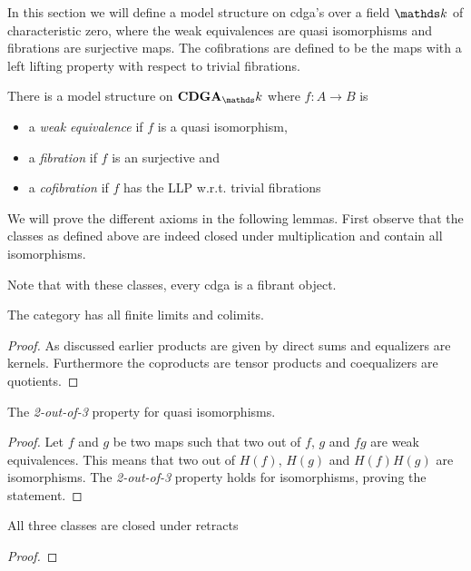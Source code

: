 
In this section we will define a model structure on cdga's over a field $\k$ of characteristic zero, where the weak equivalences are quasi isomorphisms and fibrations are surjective maps. The cofibrations are defined to be the maps with a left lifting property with respect to trivial fibrations.

\begin{proposition}
	There is a model structure on $\CDGA_\k$ where $f: A \to B$ is
	\begin{itemize}
		\item a \emph{weak equivalence} if $f$ is a quasi isomorphism,
		\item a \emph{fibration} if $f$ is an surjective and
		\item a \emph{cofibration} if $f$ has the LLP w.r.t. trivial fibrations
	\end{itemize}
\end{proposition}

We will prove the different axioms in the following lemmas. First observe that the classes as defined above are indeed closed under multiplication and contain all isomorphisms.

Note that with these classes, every cdga is a fibrant object.

\begin{lemma}
	[MC1] The category has all finite limits and colimits.
\end{lemma}
\begin{proof}
	As discussed earlier products are given by direct sums and equalizers are kernels. Furthermore the coproducts are tensor products and coequalizers are quotients.
\end{proof}

\begin{lemma}
	[MC2] The \emph{2-out-of-3} property for quasi isomorphisms.
\end{lemma}
\begin{proof}
	Let $f$ and $g$ be two maps such that two out of $f$, $g$ and $fg$ are weak equivalences. This means that two out of $H(f)$, $H(g)$ and $H(f)H(g)$ are isomorphisms. The \emph{2-out-of-3} property holds for isomorphisms, proving the statement.
\end{proof}

\begin{lemma}
	[MC3] All three classes are closed under retracts
\end{lemma}
\begin{proof}
\end{proof}

